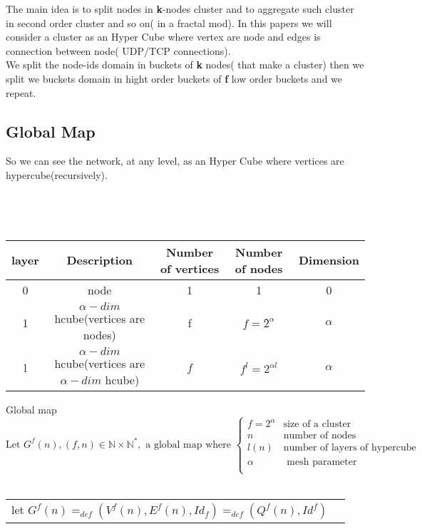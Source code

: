 The main idea is to split nodes in \textbf{k}-nodes cluster and to aggregate such cluster in second order cluster and so on( 
in a fractal mod). In this papers we will consider a cluster as an Hyper Cube where vertex are node and edges is connection 
between node( UDP/TCP connections). \\

We split the node-ids domain in buckets of \textbf{k} nodes( that make a cluster) then we split we buckets domain in hight order buckets
of \textbf{f} low order buckets and we repeat. 

\subsection{Global Map}
\begin{minipage}{0.49\textwidth}
   \centering
   \scalebox{0.3}{
     
   }
\end{minipage}
\begin{minipage}{0.49\textwidth}
So we can see the network, at any level, as an Hyper Cube where vertices are hypercube(recursively).
\end{minipage}\\\\
\begin{table}[h]
  \centering
  \begin{tabular}{|c|c|c|c|c|}
    \hline
    layer & Description & Number of vertices &  Number of nodes & Dimension\\
    \hline
    0		   	& node & 1 & 1 & 0\\
    1		   	& $\alpha-dim$ hcube(vertices are nodes) & f & $f=2̂^{\alpha}$ & $\alpha$\\
    l		   	& $\alpha-dim$ hcube(vertices are $\alpha-dim$ hcube) & $f$ & $f^{l} = 2^{\alpha l}$  & $\alpha$\\
    \hline
  \end{tabular}
  \caption{}
\end{table}

\begin{definition} Global map\\
  $$\text{Let }G^{f}(n), (f,n) \in \mathbb{N} \times \mathbb{N}^{*}, \text{ a global map where }
  \left\{\begin{array}{ll}
     f = 2^{\alpha} & \text{size of a cluster}\\
     n 	& \text{number of nodes}\\ 
     l(n) &  \text{number of layers of hypercube}\\
    \alpha & \text{ mesh parameter}\\
  \end{array}\right.$$\\
  \begin{tabular}{cc}
    let $G^{f}(n)=_{def} (V^{f}(n),E^{f}(n), Id_{f}) =_{def} (Q^{f}(n), Id^{f})$
  \end{tabular}
\end{definition}



